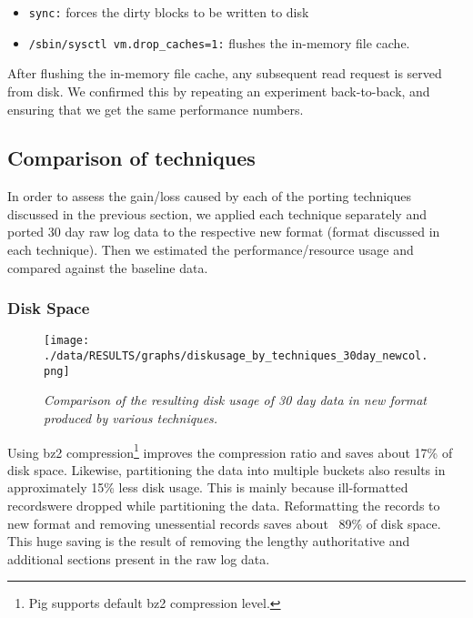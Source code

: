 \documentclass[11pt,a4paper]{article}
\newcommand{\resitem}[1]{\item #1 \vspace{-7pt}}
\begin{document}
\begin{itemize}
	\resitem {\texttt{sync:} forces the dirty blocks to be written to disk}
	\resitem {\texttt{/sbin/sysctl vm.drop\_caches=1:} flushes the in-memory file cache.}
\end{itemize}
\noindent
After flushing the in-memory file cache, any subsequent read request is served from disk. We confirmed this by repeating an experiment back-to-back, and ensuring that we get the same performance numbers.

\subsection{Comparison of techniques}
In order to assess the gain/loss caused by each of the porting techniques discussed in the previous section, we applied each technique separately and ported 30 day raw log data to the respective new format (format discussed in each technique). Then we estimated the performance/resource usage and compared against the baseline data.

\subsubsection{Disk Space}

\begin{figure}[H] 
\centering
\texttt{[image: ./data/RESULTS/graphs/diskusage\_by\_techniques\_30day\_newcol.png]}
\caption {\textit{Comparison of the resulting disk usage of 30 day data in new format produced by various techniques.}}
\end{figure}

Using bz2 compression\footnote{Pig supports default bz2 compression level.} improves the compression ratio and saves about 17\% of disk space. Likewise, partitioning the data into multiple buckets also results in approximately 15\% less disk usage. This is mainly because ill-formatted records\footnotemark were dropped while partitioning the data. Reformatting the records to new format and removing unessential records saves about ~89\% of disk space. This huge saving is the result of removing the lengthy authoritative and additional sections present in the raw log data.
\end{document}
